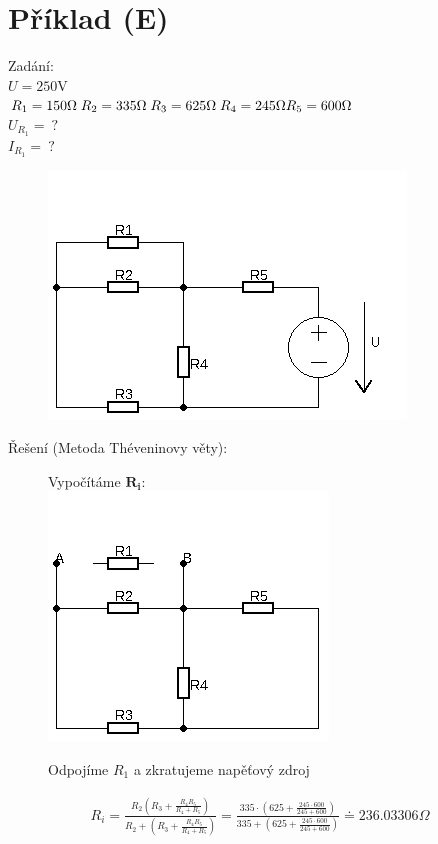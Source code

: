 \documentclass[12pt,a4paper]{article}
\begin{document}
\section{Příklad (E)}
\Large{Zadání:} \\
	$U = 250 \text{V}$ \\
	$R_1 = 150 \Omega \; R_2 = 335 \Omega \; R_3 = 625 \Omega \;
	R_4 = 245 \Omega \\ R_5 = 600 \Omega $\\
	$U_{R_1} = \: \text{?}$ \\
	$I_{R_1} = \: \text{?}$ \\
\begin{figure}[H] 
		\center\includegraphics[width=0.6\linewidth]{img5.png}
\end{figure}
\pagebreak
	{\Large Řešení (Metoda Théveninovy věty):}\\
	\begin{figure}[H]
		 Vypočítáme $\boldsymbol{R_i}$:\\
		\center\includegraphics[width=0.6\linewidth]{img6.png}
		\caption*{Odpojíme $R_1$ a zkratujeme napěťový zdroj}
\end{figure}
\begin{gather*}
		R_i = \frac{R_2(R_3+\frac{R_4 R_5}{R_4 + R_5})}{R_2+(R_3+\frac{R_4 R_5}{R_4 +R_5})} = \frac{335\cdot(625+\frac{245\cdot600}{245+600})}{335+(625+\frac{245\cdot600}{245+600})}\doteq236.03306\Omega
\end{gather*}
\end{document}
